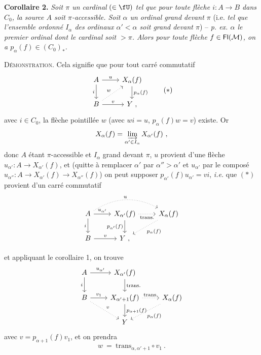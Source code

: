 
\textbf{Corollaire 2.} \textit{Soit $\pi$ un cardinal} $(\in \fU)$ \textit{tel que pour toute flèche $i : A \longrightarrow B$ dans $C_0$, la source $A$ soit $\pi$-accessible. Soit $\alpha$ un ordinal grand devant $\pi$} (i.e. \textit{tel que l'ensemble ordonné $I_\alpha$ des ordinaux $\alpha' < \alpha$ soit grand devant $\pi$}) -- \textit{p. ex. $\alpha$ le premier ordinal dont le cardinal soit $> \pi$. Alors pour toute flèche $f \in \mathsf{Fl}(\mathcal{M})$, on a $p_\alpha(f) \in (C_0)_*$.}

\textsc{Démonstration}. Cela signifie que pour tout carré commutatif
\[
\begin{tikzcd}
A \arrow[r, "u"] \arrow[d, "i"'] & X_\alpha(f) \arrow[d, "p_\alpha(f)"] \\
B \arrow[r, "v"] \arrow[ur, dotted, "w"] & Y \ ,
\end{tikzcd}
\tag*{$(*)$}
\]
avec $i \in C_0$, la flèche pointillée $w$ (avec $wi = u$, $p_\alpha(f)w = v$) existe. Or
\[
X_\alpha(f) = \varinjlim_{\alpha' \in I_\alpha} X_{\alpha'}(f) \ ,
\]
donc $A$ étant $\pi$-accessible et $I_\alpha$ grand devant $\pi$, $u$ provient d'une flèche $u_{\alpha'} : A \longrightarrow X_{\alpha'}(f)$, et (quitte à remplacer $\alpha'$ par $\alpha'' > \alpha'$ et $u_{\alpha'}$ par le composé $u_{\alpha''} : A \longrightarrow X_{\alpha'}(f) \longrightarrow X_{\alpha''}(f)$) on peut supposer $p_{\alpha'}(f)u_{\alpha'} = vi$, \textit{i.e.} que $(*)$ provient d'un carré commutatif
\[
\begin{tikzcd}
A \arrow[r, "u_{\alpha'}"] \arrow[d, "i"'] \arrow[rr, dotted, bend left=30, "u"] & X_{\alpha'}(f) \arrow[r, dotted, "\text{trans.}"'] \arrow[d, "p_{\alpha'}(f)"'] & X_\alpha(f) \arrow[dl, dotted, "p_\alpha(f)"] \\
B \arrow[r, "v"] & Y \ , &
\end{tikzcd}
\]

et appliquant le corollaire 1, on trouve
\[
\begin{tikzcd}
A \arrow[r, "u_{\alpha'}"] \arrow[d, "i"'] & X_{\alpha'}(f) \arrow[d, "\text{trans.}"] & \\
B \arrow[r, "v_1"] \arrow[dr, dotted, "v"] & X_{\alpha'+1}(f) \arrow[r, dotted, "\text{trans.}"] \arrow[d, "p_{\alpha+1}(f)"] & X_\alpha(f) \arrow[dl, dotted, "p_\alpha(f)"] \\ %
 & Y &
\end{tikzcd}
\]
avec $v = p_{\alpha+1}(f)v_1$, et on prendra %
\[
w \ = \ \mathrm{trans}_{\alpha,\alpha'+1} \circ v_1 \ .
\]


